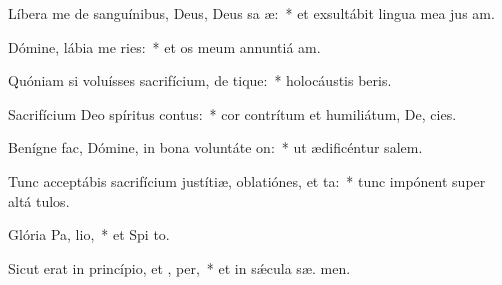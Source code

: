 \item Líbera me de sanguínibus, Deus, Deus sa æ:~* et exsultábit lingua mea jus am.
\item Dómine, lábia me ries:~* et os meum annuntiá  am.
\item Quóniam si voluísses sacrifícium, de tique:~* holocáustis  beris.
\item Sacrifícium Deo spíritus contus:~* cor contrítum et humiliátum, De,  cies.
\item Benígne fac, Dómine, in bona voluntáte  on:~* ut ædificéntur  salem.
\item Tunc acceptábis sacrifícium justítiæ, oblatiónes, et ta:~* tunc impónent super altá  tulos.
\item Glória Pa,  lio,~* et Spi to.
\item Sicut erat in princípio, et ,  per,~* et in sǽcula sæ. men.
